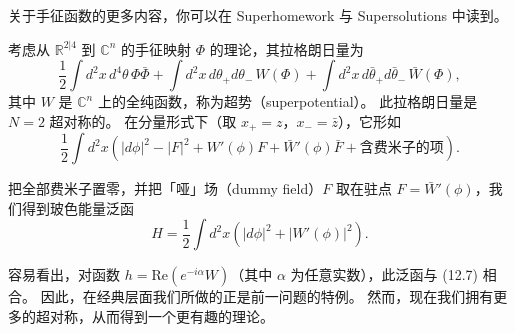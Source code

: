 
关于手征函数的更多内容，你可以在 Superhomework 与 Supersolutions 中读到。

考虑从 $\mathbb{R}^{2|4}$ 到 $\mathbb{C}^n$ 的手征映射 $\Phi$ 的理论，其拉格朗日量为
\begin{equation}
  \tag{12.13}
  \label{eq:12-13}
  \frac12\int d^2x\,d^4\theta\,\Phi\bar\Phi
  +\int d^2x\,d\theta_+d\theta_-\,W(\Phi)
  +\int d^2x\,d\bar\theta_+d\bar\theta_-\,\bar W(\Phi),
\end{equation}
其中 $W$ 是 $\mathbb{C}^n$ 上的全纯函数，称为超势（superpotential）。
此拉格朗日量是 $N=2$ 超对称的。
在分量形式下（取 $x_+=z$，$x_-=\bar z$），它形如
\begin{equation}
  \tag{12.14}
  \label{eq:12-14}
  \frac12\int d^2x\left(|d\phi|^2-|F|^2+W'(\phi)F+\bar W'(\phi)\bar F+\text{含费米子的项}\right).
\end{equation}

把全部费米子置零，并把「哑」场（dummy field）$F$ 取在驻点 $F=\bar W'(\phi)$，我们得到玻色能量泛函
\begin{equation}
  \tag{12.15}
  \label{eq:12-15}
  H=\frac12\int d^2x\left(|d\phi|^2+|W'(\phi)|^2\right).
\end{equation}

容易看出，对函数 $h=\mathrm{Re}(e^{-i\alpha}W)$（其中 $\alpha$ 为任意实数），此泛函与 (12.7) 相合。
因此，在经典层面我们所做的正是前一问题的特例。
然而，现在我们拥有更多的超对称，从而得到一个更有趣的理论。


